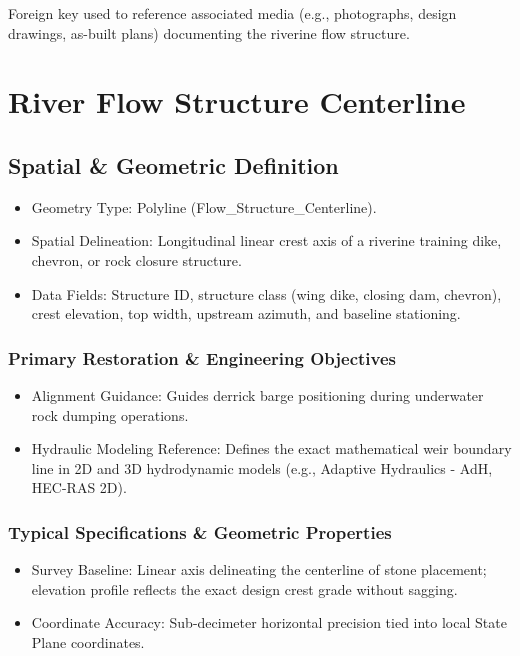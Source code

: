 \documentclass[
  letterpaper,
  DIV=11,
  numbers=noendperiod]{scrreprt}
\begin{document}
Foreign key used to reference associated media (e.g., photographs,
design drawings, as-built plans) documenting the riverine flow
structure.

\chapter{River Flow Structure
Centerline}\label{river-flow-structure-centerline}

\section{Spatial \& Geometric
Definition}\label{spatial-geometric-definition-13}

\begin{itemize}
\item
  Geometry Type: Polyline (Flow\_Structure\_Centerline).
\item
  Spatial Delineation: Longitudinal linear crest axis of a riverine
  training dike, chevron, or rock closure structure.
\item
  Data Fields: Structure ID, structure class (wing dike, closing dam,
  chevron), crest elevation, top width, upstream azimuth, and baseline
  stationing.
\end{itemize}

\subsection{Primary Restoration \& Engineering
Objectives}\label{primary-restoration-engineering-objectives-12}

\begin{itemize}
\item
  Alignment Guidance: Guides derrick barge positioning during underwater
  rock dumping operations.
\item
  Hydraulic Modeling Reference: Defines the exact mathematical weir
  boundary line in 2D and 3D hydrodynamic models (e.g., Adaptive
  Hydraulics - AdH, HEC-RAS 2D).
\end{itemize}

\subsection{Typical Specifications \& Geometric
Properties}\label{typical-specifications-geometric-properties-1}

\begin{itemize}
\item
  Survey Baseline: Linear axis delineating the centerline of stone
  placement; elevation profile reflects the exact design crest grade
  without sagging.
\item
  Coordinate Accuracy: Sub-decimeter horizontal precision tied into
  local State Plane coordinates.
\end{itemize}
\end{document}

